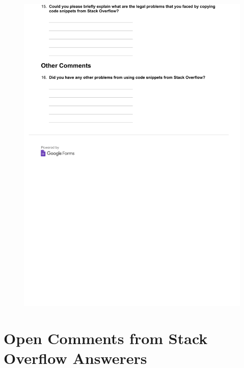 \documentclass{svjour3}                     %
\begin{document}
\begin{figure}[H]
	\centering
	\includegraphics[width=0.9\linewidth]{visitor-4}
	\label{fig:visitor-4}
\end{figure}

\section{Open Comments from Stack Overflow Answerers}\label{appendixC}
\end{document}
